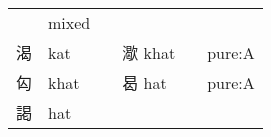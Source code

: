 \documentclass[14pt,a4paper]{scrartcl}
\begin{document}
\begin{longtable}[c]{@{}llllll@{}}
\begin{minipage}[t]{0.14\columnwidth}\raggedright\strut
\strut\end{minipage} &
\begin{minipage}[t]{0.14\columnwidth}\raggedright\strut
mixed
\strut\end{minipage}\tabularnewline
\begin{minipage}[t]{0.14\columnwidth}\raggedright\strut
渴
\strut\end{minipage} &
\begin{minipage}[t]{0.14\columnwidth}\raggedright\strut
kat
\strut\end{minipage} &
\begin{minipage}[t]{0.14\columnwidth}\raggedright\strut
\strut\end{minipage} &
\begin{minipage}[t]{0.14\columnwidth}\raggedright\strut
㵣 khat
\strut\end{minipage} &
\begin{minipage}[t]{0.14\columnwidth}\raggedright\strut
\strut\end{minipage} &
\begin{minipage}[t]{0.14\columnwidth}\raggedright\strut
pure:A
\strut\end{minipage}\tabularnewline
\begin{minipage}[t]{0.14\columnwidth}\raggedright\strut
匃
\strut\end{minipage} &
\begin{minipage}[t]{0.14\columnwidth}\raggedright\strut
khat
\strut\end{minipage} &
\begin{minipage}[t]{0.14\columnwidth}\raggedright\strut
\strut\end{minipage} &
\begin{minipage}[t]{0.14\columnwidth}\raggedright\strut
曷 hat
\strut\end{minipage} &
\begin{minipage}[t]{0.14\columnwidth}\raggedright\strut
\strut\end{minipage} &
\begin{minipage}[t]{0.14\columnwidth}\raggedright\strut
pure:A
\strut\end{minipage}\tabularnewline
\begin{minipage}[t]{0.14\columnwidth}\raggedright\strut
謁
\strut\end{minipage} &
\begin{minipage}[t]{0.14\columnwidth}\raggedright\strut
hat
\strut\end{minipage} &

\end{longtable}
\end{document}
